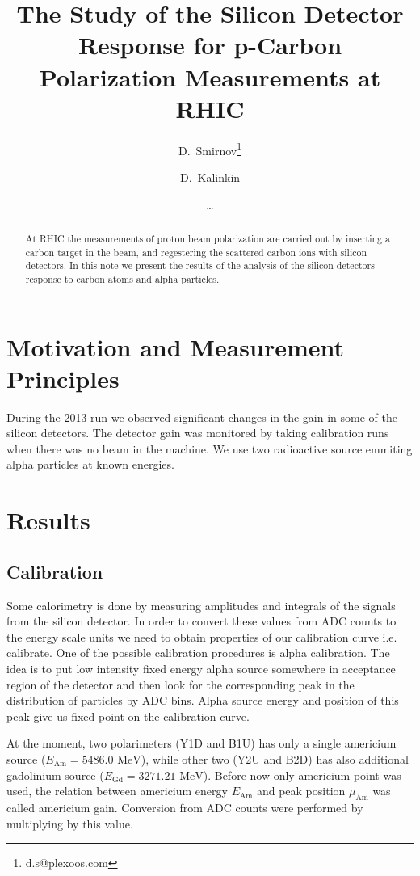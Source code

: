 \documentclass[a4paper]{article}
\title{The Study of the Silicon Detector Response for p-Carbon Polarization Measurements at RHIC}
\author[1]{D.~Smirnov\thanks{d.s@plexoos.com}}
\author[2]{D.~Kalinkin}
\author[]{\ldots}
\affil[1]{Brookhaven National Lab}
\affil[2]{ITEP}
\begin{document}
\maketitle

\begin{abstract}
At RHIC the measurements of proton beam polarization are carried out
by inserting a carbon target in the beam, and regestering the scattered carbon
ions with silicon detectors. In this note we present the results of the
analysis of the silicon detectors response to carbon atoms and alpha particles.
\end{abstract}

\section{Motivation and Measurement Principles}

During the 2013 run we observed significant changes in the gain in some of the
silicon detectors. The detector gain was monitored by taking calibration runs
when there was no beam in the machine. We use two radioactive source emmiting
alpha particles at known energies.

\section{Results}

\subsection{Calibration}

Some calorimetry is done by measuring amplitudes and integrals of the signals
from the silicon detector. In order to convert these values from ADC counts
to the energy scale units we need to obtain properties of our calibration
curve i.e. calibrate. One of the possible calibration procedures is alpha
calibration. The idea is to put low intensity fixed energy alpha source
somewhere in acceptance region of the detector and then look for the corresponding
peak in the distribution of particles by ADC bins. Alpha source energy and
position of this peak give us fixed point on the calibration curve.

At the moment, two polarimeters (Y1D and B1U) has only a single americium source
($E_{\text{Am}} = 5486.0\text{ MeV}$), while other two (Y2U and B2D) has also additional
gadolinium source ($E_{\text{Gd}} = 3271.21\text{ MeV}$). Before now only americium point was
used, the relation between americium energy $E_{\text{Am}}$ and peak position $\mu_{\text{Am}}$
was called americium gain. Conversion from ADC counts were performed by multiplying by this value.
\end{document}
